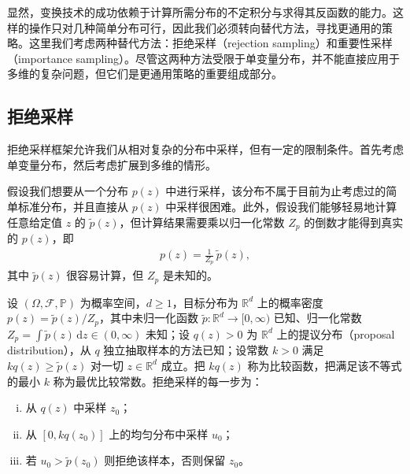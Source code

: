 \documentclass[../../main.tex]{subfiles}
\begin{document}
显然，变换技术的成功依赖于计算所需分布的不定积分与求得其反函数的能力。这样的操作只对几种简单分布可行，因此我们必须转向替代方法，寻找更通用的策略。这里我们考虑两种替代方法：拒绝采样（rejection sampling）和重要性采样（importance sampling）。尽管这两种方法受限于单变量分布，并不能直接应用于多维的复杂问题，但它们是更通用策略的重要组成部分。

\subsection{拒绝采样}\label{subsection:ch14-拒绝采样}

拒绝采样框架允许我们从相对复杂的分布中采样，但有一定的限制条件。首先考虑单变量分布，然后考虑扩展到多维的情形。

假设我们想要从一个分布 $p(z)$ 中进行采样，该分布不属于目前为止考虑过的简单标准分布，并且直接从 $p(z)$ 中采样很困难。此外，假设我们能够轻易地计算任意给定值 $z$ 的 $\widetilde{p}(z)$，但计算结果需要乘以归一化常数 $Z_{p}$ 的倒数才能得到真实的 $p(z)$，即
\begin{align}
p(z)=\frac{1}{Z_{p}}\,\widetilde{p}(z),
\label{align:ch14-未归一化}
\end{align}
其中 $\widetilde{p}(z)$ 很容易计算，但 $Z_{p}$ 是未知的。

\begin{definition}[拒绝采样]\label{definition:ch14-拒绝采样}
设 $(\Omega,\mathcal{F},\mathbb{P})$ 为概率空间，$d\geqslant1$，目标分布为 $\mathbb{R}^{d}$ 上的概率密度 $p(z)=\widetilde{p}(z)/Z_{p}$，其中未归一化函数 $\widetilde{p}:\mathbb{R}^{d}\to[0,\infty)$ 已知、归一化常数 $Z_{p}=\int\widetilde{p}(z)\,\mathrm{d}z\in(0,\infty)$ 未知；设 $q(z)>0$ 为 $\mathbb{R}^{d}$ 上的提议分布（proposal distribution），从 $q$ 独立抽取样本的方法已知；设常数 $k>0$ 满足 $kq(z)\geqslant\widetilde{p}(z)$ 对一切 $z\in\mathbb{R}^{d}$ 成立。把 $kq(z)$ 称为比较函数，把满足该不等式的最小 $k$ 称为最优比较常数。拒绝采样的每一步为：
\begin{enumerate}[(i)]
\item 从 $q(z)$ 中采样 $z_{0}$；
\item 从 $[0,kq(z_{0})]$ 上的均匀分布中采样 $u_{0}$；
\item 若 $u_{0}>\widetilde{p}(z_{0})$ 则拒绝该样本，否则保留 $z_{0}$。
\end{enumerate}
\end{definition}
\end{document}
